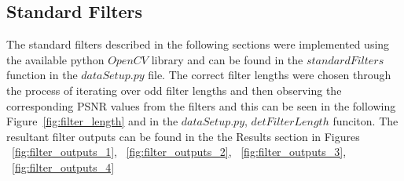 \documentclass{article}\raggedbottom
\begin{document}
\subsection{Standard Filters}
The standard filters described in the following sections were implemented using the available python $OpenCV$ library and can be found in the $standardFilters$ function in the $dataSetup.py$ file. The correct filter lengths were chosen through the process of iterating over odd filter lengths and then observing the corresponding PSNR values from the filters and this can be seen in the following Figure~\ref{fig:filter_length} and in the $dataSetup.py$, $detFilterLength$ funciton. The resultant filter outputs can be found in the the Results section in Figures ~\ref{fig:filter_outputs_1},
~\ref{fig:filter_outputs_2}, ~\ref{fig:filter_outputs_3}, ~\ref{fig:filter_outputs_4}
\end{document}
